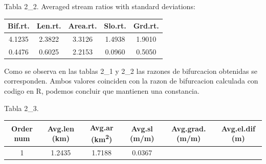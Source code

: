 \documentclass[11pt,]{article}
\begin{document}
Tabla 2\_2. Averaged stream ratios with standard deviations:

\begin{longtable}[]{@{}ccccc@{}}
\toprule
Bif.rt. & Len.rt. & Area.rt. & Slo.rt. & Grd.rt.\tabularnewline
\midrule
\endhead
4.1235 & 2.3822 & 3.3126 & 1.4938 & 1.9010\tabularnewline
0.4476 & 0.6025 & 2.2153 & 0.0960 & 0.5050\tabularnewline
\bottomrule
\end{longtable}

Como se observa en las tablas 2\_1 y 2\_2 las razones de bifurcacion
obtenidas se corresponden. Ambos valores coinciden con la razon de
bifurcacion calculada con codigo en R, podemos concluir que mantienen
una constancia.

Tabla 2\_3.

\begin{longtable}[]{@{}cccccc@{}}
\toprule
\begin{minipage}[b]{0.08\columnwidth}\centering\strut
Order num\strut
\end{minipage} & \begin{minipage}[b]{0.11\columnwidth}\centering\strut
Avg.len (km)\strut
\end{minipage} & \begin{minipage}[b]{0.25\columnwidth}\centering\strut
Avg.ar (km\textsuperscript{2})\strut
\end{minipage} & \begin{minipage}[b]{0.11\columnwidth}\centering\strut
Avg.sl (m/m)\strut
\end{minipage} & \begin{minipage}[b]{0.14\columnwidth}\centering\strut
Avg.grad. (m/m)\strut
\end{minipage} & \begin{minipage}[b]{0.13\columnwidth}\centering\strut
Avg.el.dif (m)\strut
\end{minipage}\tabularnewline
\midrule
\endhead
\begin{minipage}[t]{0.08\columnwidth}\centering\strut
1\strut
\end{minipage} & \begin{minipage}[t]{0.11\columnwidth}\centering\strut
1.2435\strut
\end{minipage} & \begin{minipage}[t]{0.25\columnwidth}\centering\strut
1.7188\strut
\end{minipage} & \begin{minipage}[t]{0.11\columnwidth}\centering\strut
0.0367\strut
\end{minipage} & \begin{minipage}[t]{0.14\columnwidth}\centering\strut

\end{minipage}
\end{longtable}
\end{document}
